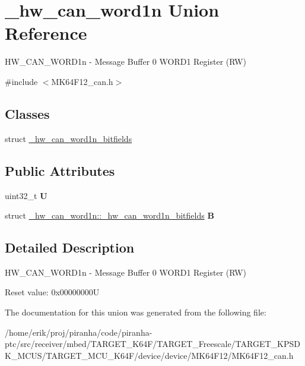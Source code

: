 \hypertarget{union__hw__can__word1n}{}\section{\+\_\+hw\+\_\+can\+\_\+word1n Union Reference}
\label{union__hw__can__word1n}


H\+W\+\_\+\+C\+A\+N\+\_\+\+W\+O\+R\+D1n -\/ Message Buffer 0 W\+O\+R\+D1 Register (RW)  




{\ttfamily \#include $<$M\+K64\+F12\+\_\+can.\+h$>$}

\subsection*{Classes}
\begin{DoxyCompactItemize}
\item 
struct \hyperlink{struct__hw__can__word1n_1_1__hw__can__word1n__bitfields}{\+\_\+hw\+\_\+can\+\_\+word1n\+\_\+bitfields}
\end{DoxyCompactItemize}
\subsection*{Public Attributes}
\begin{DoxyCompactItemize}
\item 
uint32\+\_\+t {\bfseries U}\hypertarget{union__hw__can__word1n_aa57211cafd5647a83ecdc94b9e6fdfa7}{}\label{union__hw__can__word1n_aa57211cafd5647a83ecdc94b9e6fdfa7}

\item 
struct \hyperlink{struct__hw__can__word1n_1_1__hw__can__word1n__bitfields}{\+\_\+hw\+\_\+can\+\_\+word1n\+::\+\_\+hw\+\_\+can\+\_\+word1n\+\_\+bitfields} {\bfseries B}\hypertarget{union__hw__can__word1n_a460c8b940777dc94fbd964946bf97533}{}\label{union__hw__can__word1n_a460c8b940777dc94fbd964946bf97533}

\end{DoxyCompactItemize}


\subsection{Detailed Description}
H\+W\+\_\+\+C\+A\+N\+\_\+\+W\+O\+R\+D1n -\/ Message Buffer 0 W\+O\+R\+D1 Register (RW) 

Reset value\+: 0x00000000U 

The documentation for this union was generated from the following file\+:\begin{DoxyCompactItemize}
\item 
/home/erik/proj/piranha/code/piranha-\/ptc/src/receiver/mbed/\+T\+A\+R\+G\+E\+T\+\_\+\+K64\+F/\+T\+A\+R\+G\+E\+T\+\_\+\+Freescale/\+T\+A\+R\+G\+E\+T\+\_\+\+K\+P\+S\+D\+K\+\_\+\+M\+C\+U\+S/\+T\+A\+R\+G\+E\+T\+\_\+\+M\+C\+U\+\_\+\+K64\+F/device/device/\+M\+K64\+F12/M\+K64\+F12\+\_\+can.\+h\end{DoxyCompactItemize}
